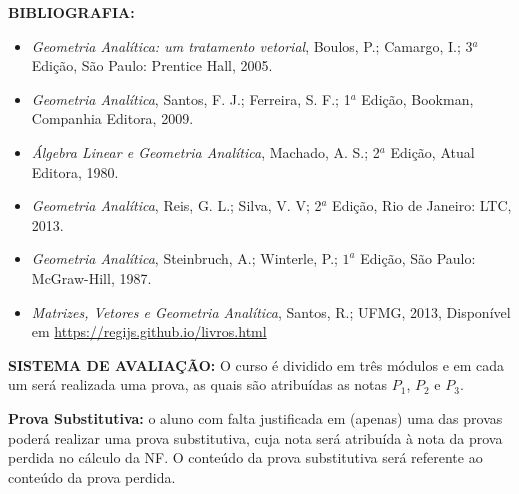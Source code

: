 \documentclass{beamer}
\begin{document}
\begin{frame}

    {\bf{BIBLIOGRAFIA:}}
    \begin{itemize}

        \item[\color{blue}{$\bullet$}] {\it Geometria Analítica: um tratamento vetorial}, Boulos, P.; Camargo, I.; 3$^a$ Edição, São Paulo: Prentice Hall, 2005.

        \item[\color{blue}{$\bullet$}] {\it Geometria Analítica},  Santos, F. J.; Ferreira, S. F.; 1$^{a}$ Edição, Bookman, Companhia Editora, 2009.

        \item[\color{blue}{$\bullet$}] {\it Álgebra Linear e Geometria Analítica}, Machado, A. S.; 2$^a$ Edição, Atual Editora, 1980.

        \item[\color{blue}{$\bullet$}] {\it Geometria Analítica}, Reis, G. L.; Silva, V. V; 2$^a$ Edição, Rio de Janeiro: LTC, 2013.

        \item[\color{blue}{$\bullet$}] {\it Geometria Analítica}, Steinbruch, A.; Winterle, P.; $1^a$ Edição, São Paulo: McGraw-Hill, 1987.

        \item[\color{blue}{$\bullet$}] {\it Matrizes, Vetores e Geometria Analítica}, Santos, R.;  UFMG, 2013, Disponível em \url{https://regijs.github.io/livros.html}
    \end{itemize}
\end{frame}

\begin{frame}
    {\bf{SISTEMA DE AVALIAÇÃO:}} O curso é dividido em três módulos \pause e em cada um será realizada uma prova, as quais são atribuídas as notas $P_1$, $P_2$
    e $P_3$.\pause

    \vspace{1cm}

    {\bf Prova Substitutiva:} o aluno com falta justificada \pause em (apenas) uma das provas \pause poderá realizar uma prova substitutiva, \pause cuja nota será atribuída à
    nota da prova perdida no cálculo da NF. \pause O conteúdo da prova substitutiva será referente ao conteúdo da prova perdida.
\end{frame}
\end{document}
